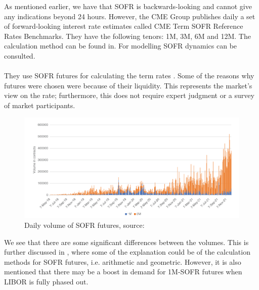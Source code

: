 As mentioned earlier, we have that SOFR is backwards-looking and cannot give any indications beyond 24 hours. However, the CME Group publishes daily a set of forward-looking interest rate estimates called CME Term SOFR Reference Rates Benchmarks. 
They have the following tenors: 1M, 3M, 6M and 12M. The calculation method can be found in\cite{CMEGroup}. For modelling SOFR dynamics \cite{gellert2021short} can be consulted.  
\\~\\ 
They use SOFR futures for calculating the term rates \cite{CMEGroup}. Some of the reasons why futures were chosen were because of their liquidity. This represents the market's view on the rate; furthermore, this does not require expert judgment or a survey of market participants.  

\begin{figure}[htp]
    \centering
    \includegraphics[width=14cm]{figures/SOFR/SOFR_future_volume.PNG}
    \caption{Daily volume of SOFR futures, source: \cite{huggins2022sofr} }
    \label{fig: Volume_SOFR_futures}
\end{figure}

We see that there are some significant differences between the volumes. This is further discussed in \cite{huggins2022sofr}, where some of the explanation could be of the calculation methods for SOFR futures, i.e. arithmetic and geometric. However, it is also mentioned that there may be a boost in demand for 1M-SOFR futures when LIBOR is fully phased out. 









